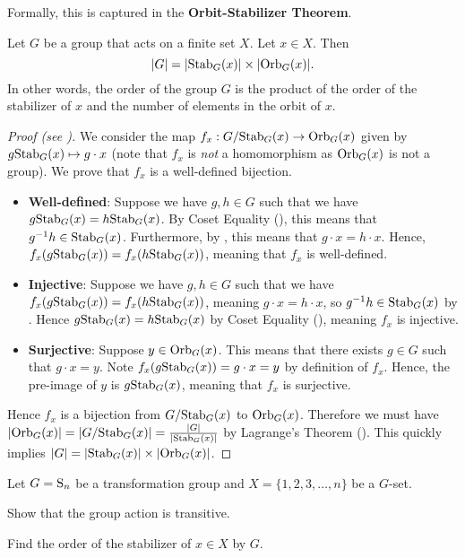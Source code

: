 Formally, this is captured in the \textbf{Orbit-Stabilizer Theorem}.
\begin{theorem}\label{thrm-orbit-stabilizer}
    Let $G$ be a group that acts on a finite set $X$. Let $x \in X$. Then
    \[
        |G| = |\mathrm{Stab}_{G}(x)| \times |\mathrm{Orb}_{G}(x)|.
    \]
    In other words, the order of the group $G$ is the product of the order of the stabilizer of $x$ and the number of elements in the orbit of $x$.
\end{theorem}

\begin{proof}[Proof (see {\cite[Theorem 10.16]{humphreys_1996}})]
    We consider the map $f_x: G/\mathrm{Stab}_{G}(x) \to \mathrm{Orb}_{G}(x)$ given by $g\mathrm{Stab}_{G}(x) \mapsto g \cdot x$ (note that $f_x$ is \textit{not} a homomorphism as $\mathrm{Orb}_{G}(x)$ is not a group). We prove that $f_x$ is a well-defined bijection.
    \begin{itemize}
        \item \textbf{Well-defined}: Suppose we have $g, h \in G$ such that we have $g\mathrm{Stab}_{G}(x) = h\mathrm{Stab}_{G}(x)$. By Coset Equality (), this means that $g^{-1}h \in \mathrm{Stab}_{G}(x)$. Furthermore, by , this means that $g\cdot x = h\cdot x$. Hence, $f_x(g\mathrm{Stab}_{G}(x)) = f_x(h\mathrm{Stab}_{G}(x))$, meaning that $f_x$ is well-defined.
        \item \textbf{Injective}: Suppose we have $g, h \in G$ such that we have $f_x(g\mathrm{Stab}_{G}(x)) = f_x(h\mathrm{Stab}_{G}(x))$, meaning $g\cdot x = h\cdot x$, so $g^{-1}h \in \mathrm{Stab}_{G}(x)$ by . Hence $g\mathrm{Stab}_{G}(x) = h\mathrm{Stab}_{G}(x)$ by Coset Equality (), meaning $f_x$ is injective.
        \item \textbf{Surjective}: Suppose $y \in \mathrm{Orb}_{G}(x)$. This means that there exists $g \in G$ such that $g\cdot x = y$. Note $f_x(g\mathrm{Stab}_{G}(x)) = g\cdot x = y$ by definition of $f_x$. Hence, the pre-image of $y$ is $g\mathrm{Stab}_{G}(x)$, meaning that $f_x$ is surjective.
    \end{itemize}
    Hence $f_x$ is a bijection from $G/\mathrm{Stab}_{G}(x)$ to $\mathrm{Orb}_{G}(x)$. Therefore we must have $|\mathrm{Orb}_{G}(x)| = |G/\mathrm{Stab}_{G}(x)| = \frac{|G|}{|\mathrm{Stab}_{G}(x)|}$ by Lagrange's Theorem (). This quickly implies $|G| = |\mathrm{Stab}_{G}(x)|\times|\mathrm{Orb}_{G}(x)|$.
\end{proof}

\begin{exercise}
    Let $G = \mathrm{S}_{n}$ be a transformation group and $X = \{1, 2, 3, \dots, n\}$ be a $G$-set.
    \begin{partquestions}{\roman*}
        \item Show that the group action is transitive.
        \item Find the order of the stabilizer of $x \in X$ by $G$.
    \end{partquestions}
\end{exercise}

